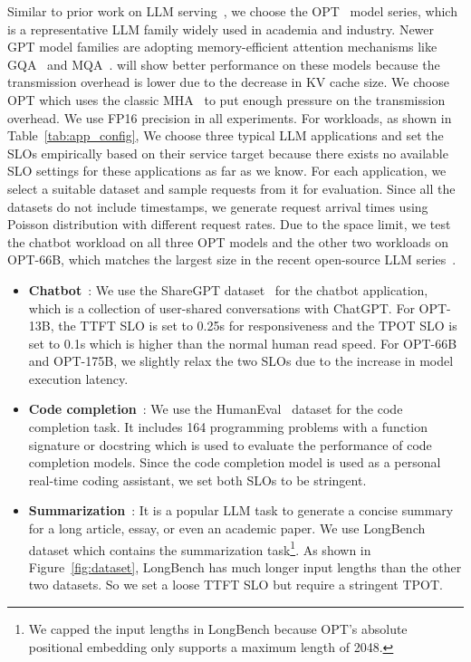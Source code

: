  Similar to prior work on LLM serving~\cite{vllm}, we choose the OPT~\cite{zhang2022opt} model series, which is a representative LLM family widely used in academia and industry. Newer GPT model families are adopting memory-efficient attention mechanisms like GQA~\cite{ainslie2023gqa} and MQA~\cite{mqa}. \sys will show better performance on these models because the transmission overhead is lower due to the decrease in KV cache size. We choose OPT which uses the classic MHA~\cite{vaswani2017attention} to put enough pressure on the transmission overhead. We use FP16 precision in all experiments. For workloads, as shown in Table~\ref{tab:app_config}, We choose three typical LLM applications and set the SLOs empirically based on their service target because there exists no available SLO settings for these applications as far as we know. For each application, we select a suitable dataset and sample requests from it for evaluation. Since all the datasets do not include timestamps, we generate request arrival times using Poisson distribution with different request rates. Due to the space limit, we test the chatbot workload on all three OPT models and the other two workloads on OPT-66B, which matches the largest size in the recent open-source LLM series~\cite{touvron2023llama}.
\begin{itemize}[leftmargin=*]
    \item \textbf{Chatbot}~\cite{chatgpt}: We use the ShareGPT dataset~\cite{sharegpt} for the chatbot application, which is a collection of user-shared conversations with ChatGPT. For OPT-13B, the TTFT SLO is set to 0.25s for responsiveness and the TPOT SLO is set to 0.1s which is higher than the normal human read speed. For OPT-66B and OPT-175B, we slightly relax the two SLOs due to the increase in model execution latency. 
    \item \textbf{Code completion}~\cite{chen2021codex}: We use the HumanEval~\cite{chen2021codex} dataset for the code completion task. It includes 164 programming problems with a function signature or docstring which is used to evaluate the performance of code completion models. Since the code completion model is used as a personal real-time coding assistant, we set both SLOs to be stringent.
    \item \textbf{Summarization}~\cite{lanchain}: It is a popular LLM task to generate a concise summary for a long article, essay, or even an academic paper. We use LongBench~\cite{bai2023longbench} dataset which contains the summarization task\footnote{We capped the input lengths in LongBench because OPT’s absolute positional embedding only supports a maximum length of 2048.}. As shown in Figure~\ref{fig:dataset}, LongBench has much longer input lengths than the other two datasets. So we set a loose TTFT SLO but require a stringent TPOT.
\end{itemize}



